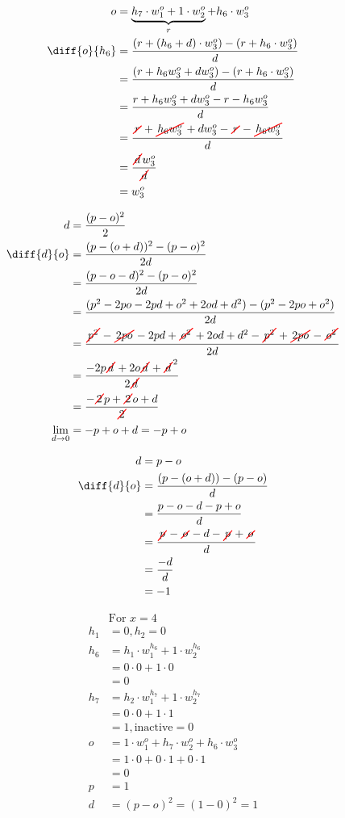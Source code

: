 \documentclass{article}
\newcommand{\cancel}[2][0.8pt]{%
	\tikz[baseline=(X.base)]{
		\node[inner sep=1pt] (X) {$#2$};
		\draw[line width=#1, red, line cap=round] (X.south west) -- (X.north east);
	}%
}
\begin{document}
\begin{align*}
o&=\underbrace{h_7\cdot w_1^o+1\cdot w_2^o}_{r}+ h_6\cdot w_3^o\\
\diff{o}{h_6}&=\frac{(r+(h_6+d)\cdot w_3^o)-(r+h_6\cdot w_3^o)}{d}\\
&=\frac{(r+h_6w_3^o+dw_3^o)-(r+h_6\cdot w_3^o)}{d}\\
&=\frac{r+h_6w_3^o+dw_3^o-r-h_6w_3^o}{d}\\
&=\frac{\cancel{r}+\cancel{h_6w_3^o}+dw_3^o-\cancel{r}-\cancel{h_6w_3^o}}{d}\\
&=\frac{\cancel{d}w_3^o}{\cancel{d}}\\
&=w_3^o
\end{align*}

\begin{align*}
	d&=\frac{(p-o)^2}{2}\\
	\diff{d}{o}&=\frac{(p-(o+d))^2-(p-o)^2}{2d}\\
	&=\frac{(p-o-d)^2-(p-o)^2}{2d}\\
	&=\frac{(p^2-2po-2pd+o^2+2od+d^2)-(p^2-2po+o^2)}{2d}\\
	&=\frac{\cancel{p^2}-\cancel{2po}-2pd+\cancel{o^2}+2od+d^2-\cancel{p^2}+\cancel{2po}-\cancel{o^2}}{2d}\\
	&=\frac{-2p\cancel{d}+2o\cancel{d}+\cancel{d}^2}{2\cancel{d}}\\
	&=\frac{-\cancel{2}p+\cancel{2}o+d}{\cancel{2}}\\
	\lim_{d\to 0}&=-p+o+d=-p+o
\end{align*}

\begin{align*}
	d&=p-o\\
	\diff{d}{o}&=\frac{(p-(o+d))-(p-o)}{d}\\
	&=\frac{p-o-d-p+o}{d}\\
	&=\frac{\cancel{p}-\cancel{o}-d-\cancel{p}+\cancel{o}}{d}\\
	&=\frac{-d}{d}\\
	&=-1
\end{align*}

\begin{align*}
	&\text{For }x=4 \\   
	h_1 &= 0, h_2 = 0\\
	h_6 &= h_1 \cdot w_1^{h_6} + 1 \cdot w_2^{h_6}\\
	&= 0 \cdot 0 + 1 \cdot 0\\
	&= 0\\
	h_7 &= h_2 \cdot w_1^{h_7} + 1 \cdot w_2^{h_7}\\
	&= 0 \cdot 0 + 1 \cdot 1\\
	&= 1, \text{inactive}=0\\
	o &= 1 \cdot w_1^o + h_7 \cdot w_2^o+h_6\cdot w_3^o\\
	&= 1\cdot 0 +0 \cdot 1 + 0 \cdot 1\\
	&=0\\
	p &= 1\\
	d &= (p - o)^2 = (1 - 0)^2 = 1\\
\end{align*}
\end{document}
